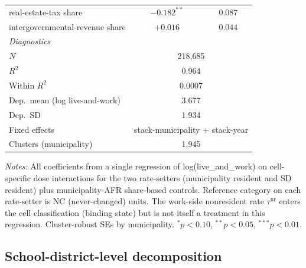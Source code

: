 \documentclass[12pt]{article}
\begin{document}
\begin{table}[!htbp]
\begin{tabular}{lcc}
        real-estate-tax share                                         & $-0.182^{**}$  & $0.087$ \\
        intergovernmental-revenue share                                   & $+0.016$       & $0.044$ \\
        \midrule
        \multicolumn{3}{l}{\textit{Diagnostics}} \\
        $N$                                                & \multicolumn{2}{c}{218{,}685} \\
        $R^2$                                              & \multicolumn{2}{c}{0.964} \\
        Within $R^2$                                       & \multicolumn{2}{c}{0.0007} \\
        Dep.\ mean (log live-and-work)                 & \multicolumn{2}{c}{3.677} \\
        Dep.\ SD                                          & \multicolumn{2}{c}{1.934} \\
        Fixed effects                                      & \multicolumn{2}{c}{stack-municipality $+$ stack-year} \\
        Clusters (municipality)                                    & \multicolumn{2}{c}{1{,}945} \\
        \bottomrule
    \end{tabular}
    \vspace{0.3em}
    \begin{minipage}{0.92\textwidth}
        \footnotesize \textit{Notes:} All coefficients from a single
        regression of log(live\_and\_work) on cell-specific dose
        interactions for the two rate-setters (municipality resident and
        SD resident) plus municipality-AFR share-based controls. Reference
        category on each rate-setter is NC (never-changed) units. The
        work-side nonresident rate $\tau^{\text{nr}}$ enters the cell
        classification (binding state) but is not itself a treatment
        in this regression. Cluster-robust SEs by municipality.
        $^{*}p<0.10$, $^{**}p<0.05$, $^{***}p<0.01$.
    \end{minipage}
\end{table}


\subsection{School-district-level decomposition}
\label{app:decomp-sd}
\label{sec:app-sd-results}
\label{subsec:app-sd-headline}
\end{document}
